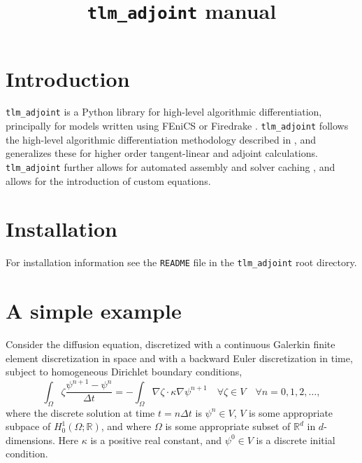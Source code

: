 \documentclass[11pt]{article}
\title{\texttt{tlm\_adjoint} manual}
\begin{document}
\maketitle

\tableofcontents

\section{Introduction}

\texttt{tlm\_adjoint} \citep{maddison2019} is a Python library for high-level
algorithmic differentiation, principally for models written using FEniCS
\citep{logg2012,alnaes2015} or Firedrake \citep{rathgeber2016}.
\texttt{tlm\_adjoint} follows the high-level algorithmic differentiation
methodology described in \citet{farrell2013}, and generalizes these for higher
order tangent-linear and adjoint calculations. \texttt{tlm\_adjoint} further
allows for automated assembly and solver caching \citep[see][]{maddison2014},
and allows for the introduction of custom equations.

\section{Installation}

For installation information see the \texttt{README} file in the
\texttt{tlm\_adjoint} root directory.

\section{A simple example}\label{sect:diffusion}

Consider the diffusion equation, discretized with a continuous Galerkin finite
element discretization in space and with a backward Euler discretization in
time, subject to homogeneous Dirichlet boundary conditions,
\begin{equation*}
  \int_\Omega \zeta \frac{\psi^{n + 1} - \psi^n}{\Delta t}
    = -\int_\Omega \nabla \zeta \cdot \kappa \nabla \psi^{n + 1}
    \quad \forall \zeta \in V \quad \forall n = 0, 1, 2, \ldots,
\end{equation*}
where the discrete solution at time $t = n \Delta t$ is $\psi^n \in V$, $V$ is
some appropriate subpace of $H^1_0 \left( \Omega; \mathbb{R} \right)$, and
where $\Omega$ is some appropriate subset of $\mathbb{R}^d$ in $d$-dimensions.
Here $\kappa$ is a positive real constant, and $\psi^0 \in V$ is a discrete
initial condition.
\end{document}
